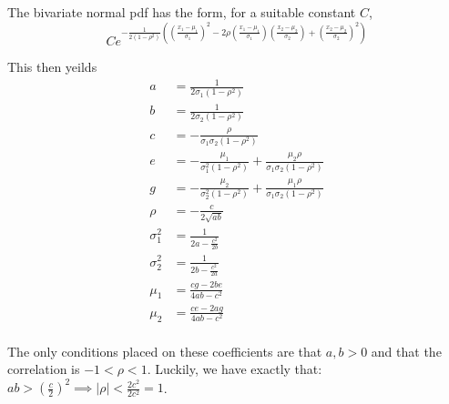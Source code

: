 \documentclass[12pt,letterpaper]{article}
\theoremstyle{definition}
\begin{document}
The bivariate normal pdf has the form, for a suitable constant $C$,
\[
  Ce^{-\frac{1}{2(1-\rho^2)}((\frac{x_1 - \mu_1}{\sigma_1})^2 - 2\rho(\frac{x_1 - \mu_1}{\sigma_1})(\frac{x_2 - \mu_2}{\sigma_2})+(\frac{x_2 - \mu_2}{\sigma_2})^2)}
\]

This then yeilds
\begin{align*}
  a &= \frac{1}{2\sigma_1(1-\rho^2)} \\
  b &= \frac{1}{2\sigma_2(1-\rho^2)} \\
  c &= -\frac{\rho}{\sigma_1\sigma_2(1-\rho^2)} \\
  e &= -\frac{\mu_1}{\sigma_1^2(1-\rho^2)} + \frac{\mu_2\rho}{\sigma_1\sigma_2(1-\rho^2)} \\
  g &= -\frac{\mu_2}{\sigma_2^2(1-\rho^2)} + \frac{\mu_1\rho}{\sigma_1\sigma_2(1-\rho^2)} \\
  \rho &= -\frac{c}{2\sqrt{ab}} \\
  \sigma_1^2 &= \frac{1}{2a - \frac{c^2}{2b}} \\
  \sigma_2^2 &= \frac{1}{2b - \frac{c^2}{2a}} \\
  \mu_1 &= \frac{cg - 2be}{4ab-c^2} \\
  \mu_2 &= \frac{ce - 2ag}{4ab-c^2} \\
\end{align*}

The only conditions placed on these coefficients are that $a, b > 0$ and that
the correlation is $-1 < \rho < 1$. Luckily, we have exactly that: $ab >
(\frac{c}{2})^2 \implies |\rho| < \frac{2c^2}{2c^2} = 1$.
\end{document}
